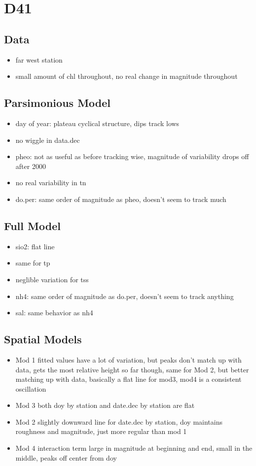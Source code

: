 \documentclass[12pt]{amsart}
\begin{document}
\section{D41}
\subsection{Data}
\begin{itemize}
\item far west station
\item small amount of chl throughout, no real change in magnitude throughout

\end{itemize}
\subsection{Parsimonious Model}
\begin{itemize}
\item day of year: plateau cyclical structure, dips track lows
\item no wiggle in data.dec
\item pheo: not as useful as before tracking wise, magnitude of variability drops off after 2000
\item no real variability in tn
\item do.per: same order of magnitude as pheo, doesn't seem to track much
\end{itemize}
\subsection{Full Model}
\begin{itemize}
\item sio2: flat line
\item same for tp
\item neglible variation for tss
\item nh4: same order of magnitude as do.per, doesn't seem to track anything
\item sal: same behavior as nh4
\end{itemize}

\subsection{Spatial Models}

\begin{itemize}
\item Mod 1 fitted values have a lot of variation, but peaks don't match up with data, gets the most relative height so far though, same for Mod 2, but better matching up with data, basically a flat line for mod3, mod4 is a consistent oscillation
\item Mod 3 both doy by station and date.dec by station are flat
\item Mod 2 slightly downward line for date.dec by station, doy maintains roughness and magnitude, just more regular than mod 1
\item Mod 4 interaction term large in magnitude at beginning and end, small in the middle, peaks off center from doy
\end{itemize}
\end{document}
